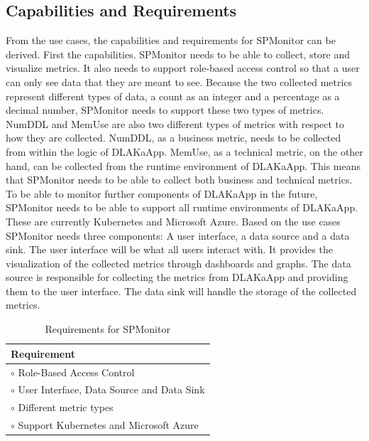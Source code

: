 \subsection{Capabilities and Requirements}
From the use cases, the capabilities and requirements for SPMonitor can be derived.
First the capabilities. SPMonitor needs to be able to collect, store and visualize
metrics. It also needs to support role-based access control so that a user
can only see data that they are meant to see. Because the two collected metrics represent
different types of data, a count as an integer and a percentage as a decimal number,
SPMonitor needs to support these two types of metrics. NumDDL and MemUse are also two different
types of metrics with respect to how they are collected. NumDDL, as a business metric, needs to
be collected from within the logic of DLAKaApp. MemUse, as a technical metric, 
on the other hand, can be collected from the runtime environment of DLAKaApp. 
This means that SPMonitor needs to be able to collect both business and technical metrics.
To be able to monitor further components of DLAKaApp in the future, 
SPMonitor needs to be able to support all runtime environments of DLAKaApp.
These are currently Kubernetes and Microsoft Azure.
Based on the use cases SPMonitor needs three components: A user interface, a data source
and a data sink.
The user interface will be what all users interact with. It provides the visualization
of the collected metrics through dashboards and graphs.
The data source is responsible for collecting the metrics from DLAKaApp and providing
them to the user interface. The data sink will handle the storage of the collected metrics.

\begin{table}[]
\centering
\begin{tabular}{l}
Requirement \\
\hline
$\circ$ Role-Based Access Control \\
$\circ$ User Interface, Data Source and Data Sink \\
$\circ$ Different metric types \\
$\circ$ Support Kubernetes and Microsoft Azure
\end{tabular}
\caption{Requirements for SPMonitor}
\label{tab:spmonitor_requirements}
\end{table}

